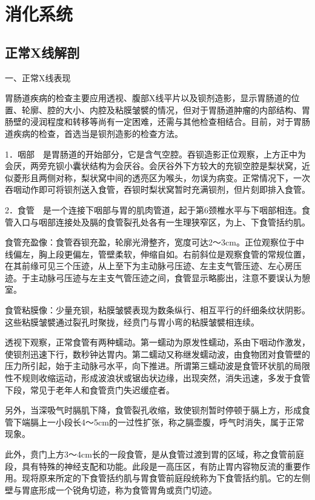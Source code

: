 \chapter{消化系统}


\section{正常X线解剖}

一、正常X线表现

胃肠道疾病的检查主要应用透视、腹部X线平片以及钡剂造影，显示胃肠道的位置、轮廓、腔的大小、内腔及粘膜皱襞的情况，但对于胃肠道肿瘤的内部结构、胃肠壁的浸润程度和转移等尚有一定困难，还需与其他检查相结合。目前，对于胃肠道疾病的检查，首选当是钡剂造影的检查方法。

1．咽部　是胃肠道的开始部分，它是含气空腔。吞钡造影正位观察，上方正中为会厌，两旁充钡小囊状结构为会厌谷。会厌谷外下方较大的充钡空腔是梨状窝，近似菱形且两侧对称，梨状窝中间的透亮区为喉头，勿误为病变。正常情况下，一次吞咽动作即可将钡剂送入食管，吞钡时梨状窝暂时充满钡剂，但片刻即排入食管。

2．食管　是一个连接下咽部与胃的肌肉管道，起于第6颈椎水平与下咽部相连。食管入口与咽部连接处及膈的食管裂孔处各有一生理狭窄区，为上、下食管括约肌。

食管充盈像：食管吞钡充盈，轮廓光滑整齐，宽度可达2～3cm。正位观察位于中线偏左，胸上段更偏左，管壁柔软，伸缩自如。右前斜位是观察食管的常规位置，在其前缘可见三个压迹，从上至下为主动脉弓压迹、左主支气管压迹、左心房压迹。于主动脉弓压迹与左主支气管压迹之间，食管显示略膨出，注意不要误认为憩室。

食管粘膜像：少量充钡，粘膜皱襞表现为数条纵行、相互平行的纤细条纹状阴影。这些粘膜皱襞通过裂孔时聚拢，经贲门与胃小弯的粘膜皱襞相连续。

透视下观察，正常食管有两种蠕动。第一蠕动为原发性蠕动，系由下咽动作激发，使钡剂迅速下行，数秒钟达胃内。第二蠕动又称继发蠕动波，由食物团对食管壁的压力所引起，始于主动脉弓水平，向下推进。所谓第三蠕动波是食管环状肌的局限性不规则收缩运动，形成波浪状或锯齿状边缘，出现突然，消失迅速，多发于食管下段，常见于老年人和食管贲门失迟缓症者。

另外，当深吸气时膈肌下降，食管裂孔收缩，致使钡剂暂时停顿于膈上方，形成食管下端膈上一小段长4～5cm的一过性扩张，称之膈壶腹，呼气时消失，属于正常现象。

此外，贲门上方3～4cm长的一段食管，是从食管过渡到胃的区域，称之食管前庭段，具有特殊的神经支配和功能。此段是一高压区，有防止胃内容物反流的重要作用。现将原来所定的下食管括约肌与胃食管前庭段统称为下食管括约肌。它的左侧壁与胃底形成一个锐角切迹，称为食管胃角或贲门切迹。


